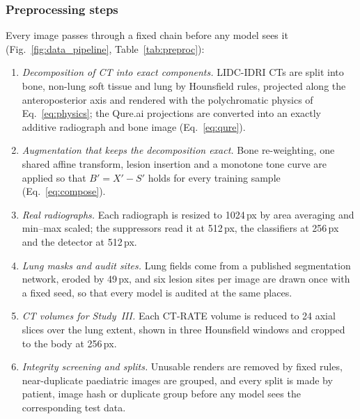 \subsubsection{Preprocessing steps}
\label{sec:m-preproc}
Every image passes through a fixed chain before any model sees it (Fig.~\ref{fig:data_pipeline}, Table~\ref{tab:preproc}):
\begin{enumerate}
\item \emph{Decomposition of CT into exact components.} LIDC-IDRI CTs are split into bone, non-lung soft tissue and lung by Hounsfield
 rules, projected along the anteroposterior axis and rendered with the polychromatic physics of Eq.~\eqref{eq:physics}; the Qure.ai
 projections are converted into an exactly additive radiograph and bone image (Eq.~\eqref{eq:qure}).
\item \emph{Augmentation that keeps the decomposition exact.} Bone re-weighting, one shared affine transform, lesion insertion and a
 monotone tone curve are applied so that $B'=X'-S'$ holds for every training sample (Eq.~\eqref{eq:compose}).
\item \emph{Real radiographs.} Each radiograph is resized to 1024\,px by area averaging and min--max scaled; the suppressors read it at
 512\,px, the classifiers at 256\,px and the detector at 512\,px.
\item \emph{Lung masks and audit sites.} Lung fields come from a published segmentation network, eroded by 49\,px, and six lesion sites
 per image are drawn once with a fixed seed, so that every model is audited at the same places.
\item \emph{CT volumes for Study~III.} Each CT-RATE volume is reduced to 24 axial slices over the lung extent, shown in three Hounsfield
 windows and cropped to the body at 256\,px.
\item \emph{Integrity screening and splits.} Unusable renders are removed by fixed rules, near-duplicate paediatric images are grouped, and
 every split is made by patient, image hash or duplicate group before any model sees the corresponding test data.
\end{enumerate}

